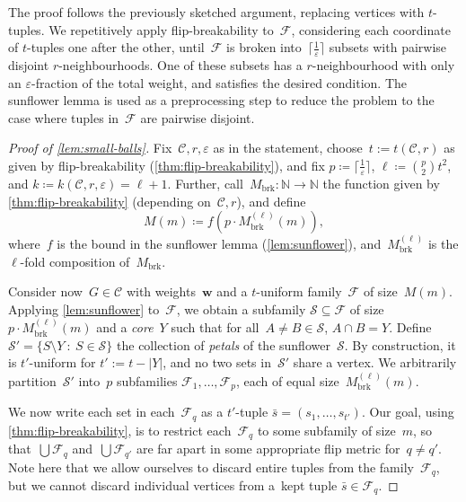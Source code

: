 \documentclass[a4paper,UKenglish,cleveref, autoref, thm-restate]{lipics-v2021}
\newcommand{\eps}{\varepsilon}
\renewcommand{\SS}{\mathcal{S}}
\newcommand{\N}[0]{\mathrm{\mathbb{N}}}
\renewcommand{\subset}{\subseteq}
\newcommand{\ceil}[1]{\lceil #1 \rceil}
\newcommand{\weight}{\mathbf{w}}
\newcommand{\CC}{\mathcal{C}}
\newcommand{\FF}{\mathcal{F}}
\begin{document}
The proof follows the previously sketched argument, replacing vertices with $t$-tuples.
We repetitively apply flip-breakability to~$\FF$, considering each coordinate of $t$-tuples one after the other,
until~$\FF$ is broken into~$\ceil{\frac{1}{\eps}}$ subsets with pairwise disjoint $r$-neighbourhoods.
One of these subsets has a $r$-neighbourhood with only an $\eps$-fraction of the total weight, and satisfies the desired condition.
The sunflower lemma is used as a preprocessing step to reduce the problem to the case where tuples in~$\FF$ are pairwise disjoint.
\begin{proof}[Proof of \cref{lem:small-balls}]
    Fix~$\CC,r,\eps$ as in the statement, choose~$t := t(\CC,r)$ as given by flip-breakability (\cref{thm:flip-breakability}),
    and fix $p \coloneqq \ceil{\frac{1}{\eps}}$, $\ell \coloneqq \binom{p}{2} t^2$, and $k \coloneqq k(\CC,r,\eps) = \ell + 1$.
    Further, call~$M_{\text{brk}} : \N \to \N$ the function given by \cref{thm:flip-breakability} (depending on~$\CC,r$),
    and define \[M(m) \coloneqq f(p \cdot M_{\text{brk}}^{(\ell)}(m)),\] where~$f$ is the bound in the sunflower lemma (\cref{lem:sunflower}), and~$M_{\text{brk}}^{(\ell)}$ is the $\ell$-fold composition of~$M_{\text{brk}}$.

    Consider now~$G \in \CC$ with weights~$\weight$ and a $t$-uniform family~$\FF$ of size~$M(m)$.
    Applying \cref{lem:sunflower} to~$\FF$, we obtain a subfamily $\SS \subset \FF$ of size~$p \cdot M_{\text{brk}}^{(\ell)}(m)$ and a \emph{core}~$Y$ such that for all~$A \neq B \in \SS$, $A \cap B = Y$.
    Define $\SS' = \{S \setminus Y~\colon~S \in \SS\}$ the collection of \emph{petals} of the sunflower~$\SS$.
    By construction, it is $t'$-uniform for $t' := t - |Y|$, and no two sets in~$\SS'$ share a vertex.
    We arbitrarily partition~$\SS'$ into~$p$ subfamilies $\FF_1,\dots,\FF_p$, each of equal size~$M_{\text{brk}}^{(\ell)}(m)$.

    We now write each set in each~$\FF_q$ as a $t'$-tuple $\bar{s} = (s_1,\dots,s_{t'})$.
    Our goal, using \cref{thm:flip-breakability}, is to restrict each~$\FF_q$ to some subfamily of size~$m$,
    so that~$\bigcup \FF_q$ and~$\bigcup \FF_{q'}$ are far apart in some appropriate flip metric for~$q \neq q'$.
    Note here that we allow ourselves to discard entire tuples from the family~$\FF_q$, but we cannot discard individual vertices from a~kept tuple $\bar{s} \in \FF_q$.


\end{proof}
\end{document}
